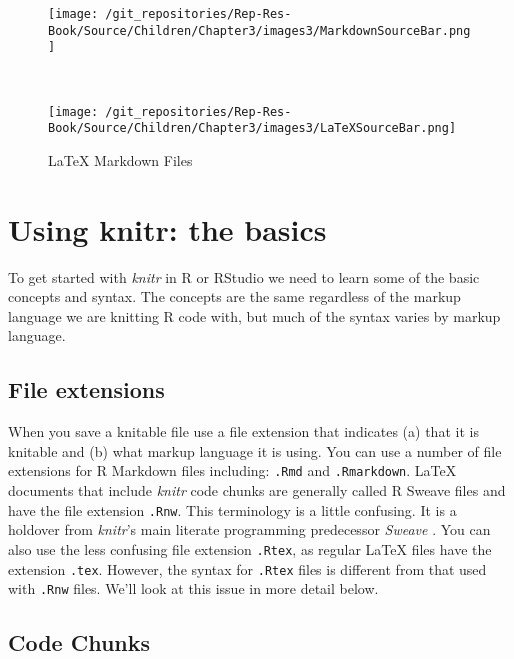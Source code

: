 {\begin{figure}[ht]
\begin{center}
        \begin{subfigure}
            \caption{R Markdown Files}
            \texttt{[image: /git\_repositories/Rep-Res-Book/Source/Children/Chapter3/images3/MarkdownSourceBar.png]}
        \end{subfigure}\\[0.5cm]
        
        \begin{subfigure}
            \caption{LaTeX Markdown Files}
            \texttt{[image: /git\_repositories/Rep-Res-Book/Source/Children/Chapter3/images3/LaTeXSourceBar.png]}
        \end{subfigure}
        
    \end{center}
\end{figure}



\section{Using knitr: the basics}

To get started with {\emph{knitr}} in R or RStudio we need to learn some of the basic concepts and syntax. The concepts are the same regardless of the markup language we are knitting R code with, but much of the syntax varies by markup language.

\subsection{File extensions}

When you save a knitable file use a file extension that indicates (a) that it is knitable and (b) what markup language it is using. You can use a number of file extensions for R Markdown files including: \texttt{.Rmd} and \texttt{.Rmarkdown}. LaTeX documents that include {\emph{knitr}} code chunks are generally called R Sweave files and have the file extension {\tt{.Rnw}}. This terminology is a little confusing. It is a holdover from {\emph{knitr}}'s main literate programming predecessor {\emph{Sweave}} \cite[]{Leisch2002}. You can also use the less confusing file extension \texttt{.Rtex}, as regular LaTeX files have the extension \texttt{.tex}. However, the syntax for \texttt{.Rtex} files is different from that used with \texttt{.Rnw} files. We'll look at this issue in more detail below.

\subsection{Code Chunks}

}
